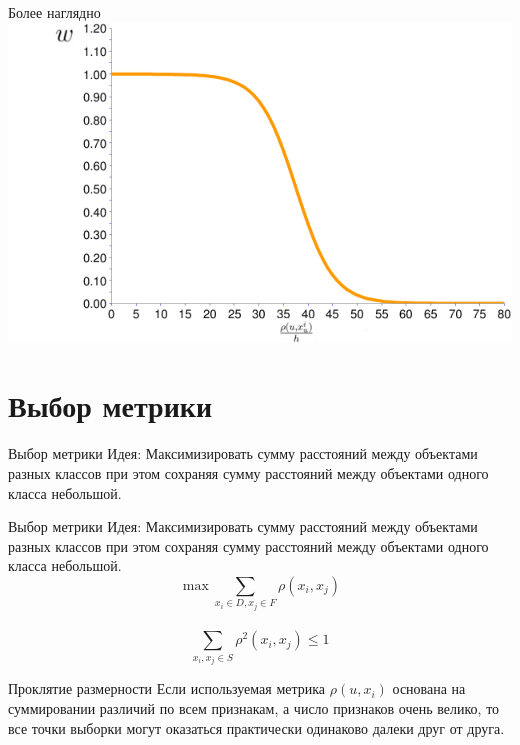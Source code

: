 \documentclass[10pt]{beamer}
\begin{document}
\begin{frame}{Более наглядно}
    \centering
	\includegraphics[width=\linewidth,height=\textheight,keepaspectratio]{images/parzen}
\end{frame}

\section{Выбор метрики}

\begin{frame}{Выбор метрики}
	\alert{Идея}: Максимизировать сумму расстояний между объектами разных классов
	при этом сохраняя сумму расстояний между объектами одного класса небольшой.\\
\end{frame}

\begin{frame}{Выбор метрики}
	\alert{Идея}: Максимизировать сумму расстояний между объектами разных классов
	при этом сохраняя сумму расстояний между объектами одного класса небольшой.\\
	\bigbreak
	$${\max \sum\limits_{x_i \in D, x_j \in F} \rho(x_i, x_j) }$$\\
	\bigbreak
	$${\sum\limits_{x_i, x_j \in S} \rho^2(x_i, x_j) \leq 1 }$$
\end{frame}

\begin{frame}{Проклятие размерности}
	\centering
	Если используемая метрика ${\rho(u, x_i)}$ основана на суммировании различий по всем признакам, а число признаков очень велико,
	то все точки выборки могут оказаться практически одинаково далеки друг от друга.\\
\end{frame}
\end{document}
